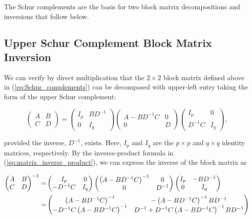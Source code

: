 \documentclass[12pt, twoside, draft]{article}
\begin{document}
The Schur complements are the basis for two block matrix decompositions and inversions that follow below.

\subsection{Upper Schur Complement Block Matrix Inversion}\label{sec:upper-schur}
We can verify by direct multiplication that the $2 \times 2$ block matrix defined above in (\ref{eq:Schur_complements}) can be decomposed with upper-left entry taking the form of the upper Schur complement:

\begin{equation}\label{eq:block_matrix_decomposition_upper}
\begin{pmatrix}
A & B \\
C & D
\end{pmatrix} = 
\begin{pmatrix}
I_p & BD^{-1} \\
0 & I_q
\end{pmatrix}
\begin{pmatrix}
A - BD^{-1}C & 0 \\
0 & D
\end{pmatrix}
\begin{pmatrix}
I_p & 0 \\
D^{-1}C & I_q
\end{pmatrix},
\end{equation}

provided the inverse, $D^{-1}$, exists.  Here, $I_p$ and $I_q$ are the $p \times p$ and $q \times q$ identity matrices, respectively.  By the inverse-product formula in (\ref{eq:matrix_inverse_product}), we can express the inverse of the block matrix as

\begin{align}\label{eq:block_matrix_inverse_upper}
\begin{pmatrix}
A & B \\
C & D
\end{pmatrix}^{-1} = &
\begin{pmatrix}
I_p & 0 \\
-D^{-1}C & I_q
\end{pmatrix}
\begin{pmatrix}
\left( A - BD^{-1}C \right)^{-1} & 0 \\
0 & D^{-1}
\end{pmatrix}
\begin{pmatrix}
I_p & -BD^{-1} \\
0 & I_q
\end{pmatrix} \notag \\
= & \begin{pmatrix}
\left( A - BD^{-1}C \right)^{-1} & -\left( A - BD^{-1}C \right)^{-1} BD^{-1} \\
-D^{-1}C \left( A - BD^{-1}C \right)^{-1} & D^{-1} + D^{-1}C \left( A - BD^{-1}C \right)^{-1} BD^{-1}
\end{pmatrix}
\end{align}
\end{document}
